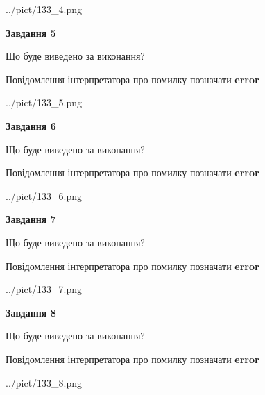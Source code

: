 \documentclass[12pt, ukrainian]{article}
\begin{document}
{\begin{center}
	{../pict/133_4.png}
\end{center}
\newpage

{\begin {center}\textbf{Завдання 5}\end {center}}\par
Що буде виведено за виконання? \par
Повідомлення інтерпретатора про помилку позначати \textbf{error}

\begin{center}
	{../pict/133_5.png}
\end{center}
\newpage

{\begin {center}\textbf{Завдання 6}\end {center}}\par
Що буде виведено за виконання? \par
Повідомлення інтерпретатора про помилку позначати \textbf{error}

\begin{center}
	{../pict/133_6.png}
\end{center}
\newpage

{\begin {center}\textbf{Завдання 7}\end {center}}\par
Що буде виведено за виконання? \par
Повідомлення інтерпретатора про помилку позначати \textbf{error}

\begin{center}
	{../pict/133_7.png}
\end{center}
\newpage

{\begin {center}\textbf{Завдання 8}\end {center}}\par
Що буде виведено за виконання? \par
Повідомлення інтерпретатора про помилку позначати \textbf{error}

\begin{center}
	{../pict/133_8.png}
\end{center}
\newpage

}
\end{document}
